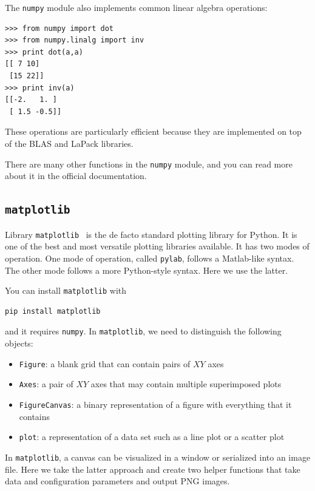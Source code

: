 \documentclass[justified,sixbynine]{tufte-book}
\def\ft{\small\tt}
\theoremstyle{plain}%
\theoremstyle{definition}
\theoremstyle{remark}
\begin{document}
\begin{fullwidth}
The {\ft numpy} module also implements common linear algebra operations:

\begin{lstlisting}
>>> from numpy import dot
>>> from numpy.linalg import inv
>>> print dot(a,a)
[[ 7 10]
 [15 22]]
>>> print inv(a)
[[-2.   1. ]
 [ 1.5 -0.5]]
\end{lstlisting}

These operations are particularly efficient because they are implemented on top of the BLAS and LaPack libraries.

There are many other functions in the {\ft numpy} module, and you can read more about it in the official documentation.

\goodbreak\subsection{{\ft matplotlib}}


Library {\ft matplotlib}~\cite{matplotlib} is the de facto standard plotting library for Python. It is one of the best and most versatile plotting libraries available. It has two modes of operation. One mode of operation, called {\ft pylab}, follows a Matlab-like syntax. The other mode follows a more Python-style syntax. Here we use the latter.

You can install {\ft matplotlib} with
\begin{lstlisting}
pip install matplotlib
\end{lstlisting}
and it requires {\ft numpy}.
In {\ft matplotlib}, we need to distinguish the following objects:
\begin{itemize}
\item {\ft Figure}: a blank grid that can contain pairs of $XY$ axes
\item {\ft Axes}: a pair of $XY$ axes that may contain multiple superimposed plots
\item {\ft FigureCanvas}: a binary representation of a figure with everything that it contains
\item {\ft plot}: a representation of a data set such as a line plot or a scatter plot
\end{itemize}

In {\ft matplotlib}, a canvas can be visualized in a window or serialized into an image file. Here we take the latter approach and create two helper functions that take data and configuration parameters and output PNG images.


\end{fullwidth}
\end{document}
